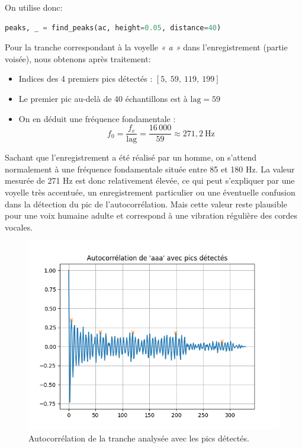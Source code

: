 On utilise donc: 

\begin{lstlisting}[language=python]
    peaks, _ = find_peaks(ac, height=0.05, distance=40)
\end{lstlisting}

Pour la tranche correspondant à la voyelle \textit{« a »} dans l’enregistrement (partie voisée), nous obtenons après traitement:

\begin{itemize}
    \item Indices des 4 premiers pics détectés : \([5,\ 59,\ 119,\ 199]\)
    \item Le premier pic au-delà de 40 échantillons est à \(\text{lag} = 59\)
    \item On en déduit une fréquence fondamentale :
    \[
    f_0 = \frac{f_e}{\text{lag}} = \frac{16\,000}{59} \approx 271{,}2\ \mathrm{Hz}
    \]
\end{itemize}

Sachant que l'enregistrement a été réalisé par un homme, on s’attend normalement à une fréquence fondamentale située entre 85 et 180 Hz. La valeur mesurée de 271 Hz est donc relativement élevée, ce qui peut s’expliquer par une voyelle très accentuée, un enregistrement particulier ou une éventuelle confusion dans la détection du pic de l’autocorrélation.
Mais cette valeur reste plausible pour une voix humaine adulte et correspond à une vibration régulière des cordes vocales.

\begin{figure}[h!]
    \centering
    \includegraphics[width=17cm]{screenshots/autocorrelation_avec_pics_detectes.png}
    \caption{Autocorrélation de la tranche analysée avec les pics détectés.}
\end{figure}


